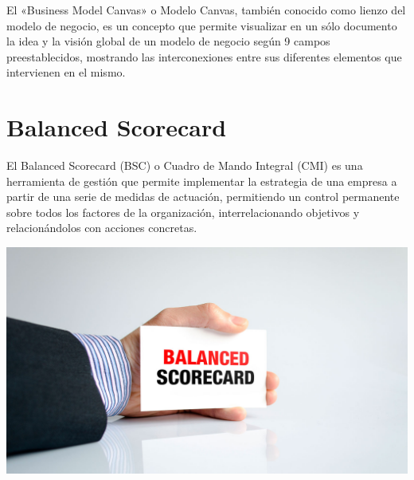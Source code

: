 El «Business Model Canvas» o Modelo Canvas, también conocido como lienzo del modelo de negocio, es un concepto que permite visualizar en un sólo documento la idea y la visión global de un modelo de negocio según 9 campos preestablecidos, mostrando las interconexiones entre sus diferentes elementos que intervienen en el mismo.
\newpage


\section{Balanced Scorecard}
\item{El Balanced Scorecard (BSC) o Cuadro de Mando Integral (CMI) es una herramienta de gestión que permite implementar la estrategia de una empresa a partir de una serie de medidas de actuación, permitiendo un control permanente sobre todos los factores de la organización, interrelacionando objetivos y relacionándolos con acciones concretas.}

\begin{center}
\includegraphics[width=15cm]{./Imagenes/imagen1}
\end{center}

